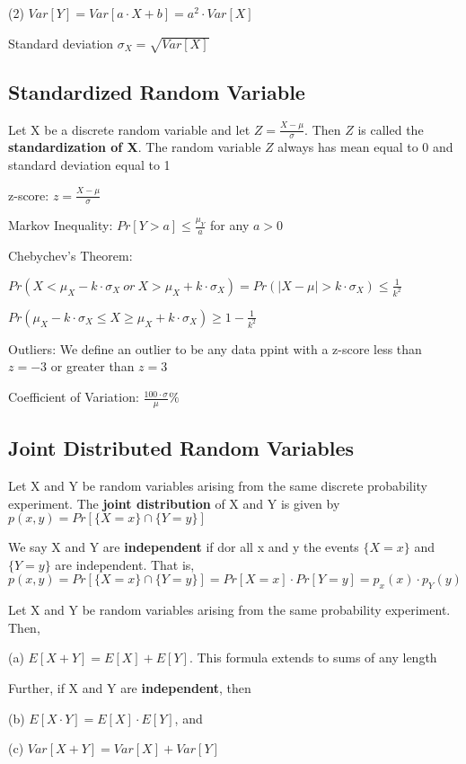 \documentclass[12pt]{article}
\begin{document}
\begin{spacing}{2.0}
(2) $Var[Y]= Var[a\cdot X+b]= a^2 \cdot Var[X]$

Standard deviation $\sigma_X= \sqrt{Var[X]}$

\subsection{Standardized Random Variable}

Let X be a discrete random variable and let $Z= \frac{X-\mu}{\sigma}$. Then $Z$ is called the \textbf{standardization of X}. The random variable $Z$ always has mean equal to 0 and standard deviation equal to 1

z-score: $z=\frac{X-\mu}{\sigma}$

Markov Inequality: $Pr[Y>a] \le \frac{\mu_Y}{a}$ for any $a>0$

Chebychev's Theorem:

$Pr(X< \mu_X - k\cdot \sigma_X\ or\ X>\mu_X + k\cdot \sigma_X)= Pr(|X-\mu|>k \cdot \sigma_X) \le \frac{1}{k^2}$

$Pr(\mu_X - k \cdot \sigma_X \le X \ge \mu_X + k \cdot \sigma_X) \ge 1-\frac{1}{k^2}$

Outliers: We define an outlier to be any data ppint with a z-score less than $z=-3$ or greater than $z=3$

Coefficient of Variation: $\frac{100 \cdot \sigma}{\mu} \%$

\subsection{Joint Distributed Random Variables}

Let X and Y be random variables arising from the same discrete probability experiment. The \textbf{joint distribution} of X and Y is given by $p(x,y)= Pr[\{ X=x \} \cap \{ Y=y \}]$

We say X and Y are \textbf{independent} if dor all x and y the events $\{ X=x \}$ and $\{ Y=y \}$ are independent. That is, $p(x,y)= Pr[\{ X=x \} \cap \{ Y=y \}]= Pr[X=x] \cdot Pr[Y=y]= p_x(x) \cdot p_Y (y)$

Let X and Y be random variables arising from the same probability experiment. Then,

(a) $E[X+Y]= E[X]+ E[Y]$. This formula extends to sums of any length

Further, if X and Y are \textbf{independent}, then

(b) $E[X \cdot Y]= E[X] \cdot E[Y]$, and

(c) $Var[X+Y]= Var[X] + Var[Y]$


\end{spacing}
\end{document}
